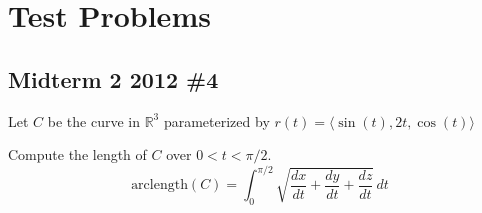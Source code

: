 \documentclass{report}
\begin{document}
\chapter{Test Problems}
\section{Midterm 2 2012 \#4}
Let $C$ be the curve in $\mathbb{R}^3$ parameterized by $r(t) = \langle \sin(t), 2t, \cos(t) \rangle$

Compute the length of $C$ over $0 < t < \pi/2$.
$$
\text{arclength}(C) = \int_0^{\pi/2} \sqrt{\frac{dx}{dt} + \frac{dy}{dt} + \frac{dz}{dt}} \,dt
$$
\end{document}

